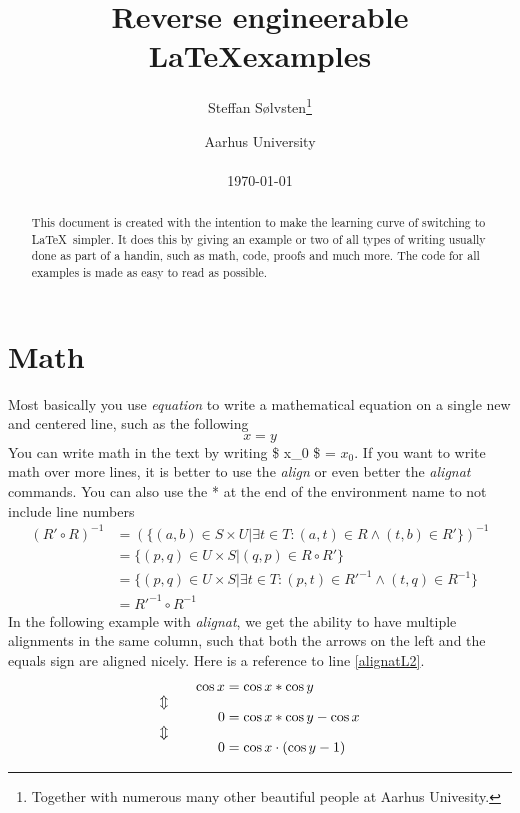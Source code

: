 \documentclass[english]{article}
\title{{\LARGE Reverse engineerable \LaTeX examples}}
\author{Steffan Sølvsten\footnote{Together with numerous many other beautiful
    people at Aarhus Univesity.}}
\date{Aarhus University \\ \mailto{soelvsten@cs.au.dk} \\[\baselineskip] \today}
\begin{document}
\maketitle

\begin{abstract}
  This document is created with the intention to make the learning curve of
  switching to \LaTeX\ simpler. It does this by giving an example or two of all
  types of writing usually done as part of a handin, such as math, code, proofs
  and much more. The code for all examples is made as easy to read as possible.
\end{abstract}

\newpage
\tableofcontents

\newpage
\section{Math} \label{sec:math}
Most basically you use \emph{equation} to write a mathematical equation on a
single new and centered line, such as the following
\begin{equation}
  x = y
\end{equation}
You can write math in the text by writing \$ x\_0 \$ = $x_0$. If you want to
write math over more lines, it is better to use the \emph{align} or even better
the \emph{alignat} commands. You can also use the * at the end of the
environment name to not include line numbers
\begin{align*}
  (R' \circ R)^{-1}
    &= (\{(a,b) \in S \times U | \exists t \in T: (a,t) \in R \wedge (t,b) \in R'\})^{-1}
\\
    &= \{(p,q) \in U \times S | (q,p) \in R \circ R' \}
\\
    &= \{(p,q) \in U \times S | \exists t \in T : (p,t) \in R'^{-1} \wedge (t,q) \in R^{-1}\}
\\
    &= R'^{-1} \circ R^{-1}
\end{align*}
In the following example with \emph{alignat}, we get the ability to have
multiple alignments in the same column, such that both the arrows on the left
and the equals sign are aligned nicely. Here is a reference to line
\ref{alignatL2}.
\begin{alignat}{2}
    && \cos x &= \cos x * \cos y \label{alignatL1}
\\ \ArrowBetweenLines
    && 0 &= \cos x * \cos y - \cos x \label{alignatL2}
\\ \ArrowBetweenLines
    && 0 &= \cos x \cdot (\cos y - 1) \label{alignatL3}
\end{alignat}
\end{document}
